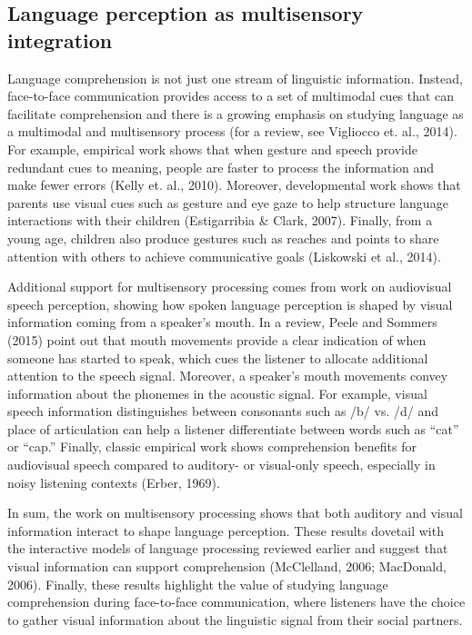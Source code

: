 \documentclass[english,floatsintext,man]{apa6}
\theoremstyle{definition}
\theoremstyle{definition}
\theoremstyle{definition}
\theoremstyle{remark}
\begin{document}
\hypertarget{language-perception-as-multisensory-integration}{%
\subsection{Language perception as multisensory
integration}\label{language-perception-as-multisensory-integration}}

Language comprehension is not just one stream of linguistic information.
Instead, face-to-face communication provides access to a set of
multimodal cues that can facilitate comprehension and there is a growing
emphasis on studying language as a multimodal and multisensory process
(for a review, see Vigliocco et. al., 2014). For example, empirical work
shows that when gesture and speech provide redundant cues to meaning,
people are faster to process the information and make fewer errors
(Kelly et. al., 2010). Moreover, developmental work shows that parents
use visual cues such as gesture and eye gaze to help structure language
interactions with their children (Estigarribia \& Clark, 2007). Finally,
from a young age, children also produce gestures such as reaches and
points to share attention with others to achieve communicative goals
(Liskowski et al., 2014).

Additional support for multisensory processing comes from work on
audiovisual speech perception, showing how spoken language perception is
shaped by visual information coming from a speaker's mouth. In a review,
Peele and Sommers (2015) point out that mouth movements provide a clear
indication of when someone has started to speak, which cues the listener
to allocate additional attention to the speech signal. Moreover, a
speaker's mouth movements convey information about the phonemes in the
acoustic signal. For example, visual speech information distinguishes
between consonants such as /b/ vs. /d/ and place of articulation can
help a listener differentiate between words such as \enquote{cat} or
\enquote{cap.} Finally, classic empirical work shows comprehension
benefits for audiovisual speech compared to auditory- or visual-only
speech, especially in noisy listening contexts (Erber, 1969).

In sum, the work on multisensory processing shows that both auditory and
visual information interact to shape language perception. These results
dovetail with the interactive models of language processing reviewed
earlier and suggest that visual information can support comprehension
(McClelland, 2006; MacDonald, 2006). Finally, these results highlight
the value of studying language comprehension during face-to-face
communication, where listeners have the choice to gather visual
information about the linguistic signal from their social partners.
\end{document}
